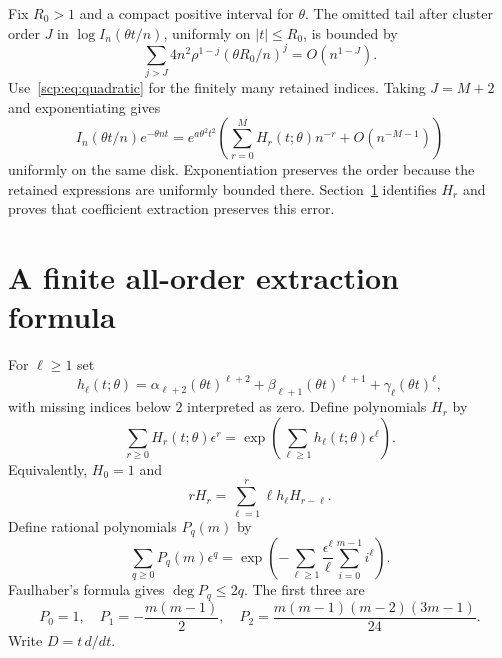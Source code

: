 \documentclass[11pt]{article}
\begin{document}
Fix $R_0>1$ and a compact positive interval for $\theta$. The omitted tail after cluster order $J$ in $\log I_n(\theta t/n)$, uniformly on $|t|\le R_0$, is bounded by
\begin{equation}\label{scp:eq:logtail}
 \sum_{j>J}4n^2\rho^{1-j}(\theta R_0/n)^j=O(n^{1-J}).
\end{equation}
Use~\eqref{scp:eq:quadratic} for the finitely many retained indices. Taking $J=M+2$ and exponentiating gives
\begin{equation}\label{scp:eq:Hexp}
 I_n(\theta t/n)e^{-\theta nt}
 =e^{a\theta^2t^2}
 \left(\sum_{r=0}^M H_r(t;\theta)n^{-r}+O(n^{-M-1})\right)
\end{equation}
uniformly on the same disk. Exponentiation preserves the order because the retained expressions are uniformly bounded there. Section~\ref{scp:sec:transfer} identifies $H_r$ and proves that coefficient extraction preserves this error.

\section{A finite all-order extraction formula}\label{scp:sec:transfer}
For $\ell\ge1$ set
\begin{equation}\label{scp:eq:h}
 h_\ell(t;\theta)=\alpha_{\ell+2}(\theta t)^{\ell+2}
   +\beta_{\ell+1}(\theta t)^{\ell+1}
   +\gamma_\ell(\theta t)^\ell,
\end{equation}
with missing indices below $2$ interpreted as zero. Define polynomials $H_r$ by
\[
 \sum_{r\ge0}H_r(t;\theta)\epsilon^r
 =\exp\left(\sum_{\ell\ge1}h_\ell(t;\theta)\epsilon^\ell\right).
\]
Equivalently, $H_0=1$ and
\begin{equation}\label{scp:eq:Hrec}
 rH_r=\sum_{\ell=1}^r\ell h_\ell H_{r-\ell}.
\end{equation}
Define rational polynomials $P_q(m)$ by
\begin{equation}\label{scp:eq:P}
 \sum_{q\ge0}P_q(m)\epsilon^q
 =\exp\left(-\sum_{\ell\ge1}\frac{\epsilon^\ell}{\ell}
                      \sum_{i=0}^{m-1}i^\ell\right).
\end{equation}
Faulhaber's formula gives $\deg P_q\le2q$. The first three are
\[
 P_0=1,\quad P_1=-\frac{m(m-1)}2,\quad
 P_2=\frac{m(m-1)(m-2)(3m-1)}{24}.
\]
Write $D=t\,d/dt$.
\end{document}
